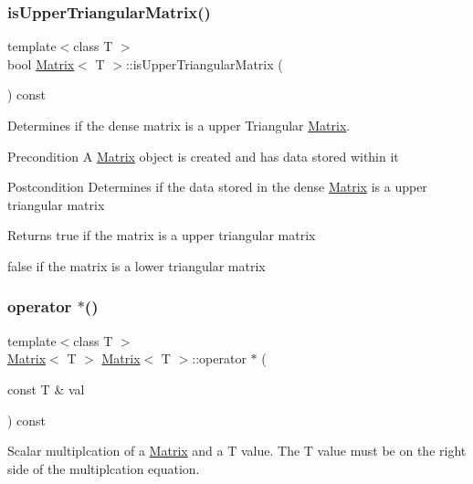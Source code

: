 \subsubsection{\texorpdfstring{isUpperTriangularMatrix()}{isUpperTriangularMatrix()}}
{\footnotesize\ttfamily template$<$class T $>$ \\
bool \mbox{\hyperlink{class_matrix}{Matrix}}$<$ T $>$\+::is\+Upper\+Triangular\+Matrix (\begin{DoxyParamCaption}{ }\end{DoxyParamCaption}) const}



Determines if the dense matrix is a upper Triangular \mbox{\hyperlink{class_matrix}{Matrix}}. 

\begin{DoxyPrecond}{Precondition}
A \mbox{\hyperlink{class_matrix}{Matrix}} object is created and has data stored within it 
\end{DoxyPrecond}
\begin{DoxyPostcond}{Postcondition}
Determines if the data stored in the dense \mbox{\hyperlink{class_matrix}{Matrix}} is a upper triangular matrix
\end{DoxyPostcond}
\begin{DoxyReturn}{Returns}
true if the matrix is a upper triangular matrix 

false if the matrix is a lower triangular matrix 
\end{DoxyReturn}
\mbox{\label{class_matrix_a9b987f07fb3d4fcf2b038cbfd6615650}} 
\subsubsection{\texorpdfstring{operator $\ast$()}{operator *()}}
{\footnotesize\ttfamily template$<$class T $>$ \\
\mbox{\hyperlink{class_matrix}{Matrix}}$<$ T $>$ \mbox{\hyperlink{class_matrix}{Matrix}}$<$ T $>$\+::operator $\ast$ (\begin{DoxyParamCaption}\item[{const T \&}]{val }\end{DoxyParamCaption}) const\hspace{0.3cm}{\ttfamily [virtual]}}



Scalar multiplcation of a \mbox{\hyperlink{class_matrix}{Matrix}} and a T value. The T value must be on the right side of the multiplcation equation. 

